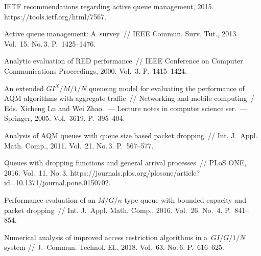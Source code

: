  \begin{multicols}{2}

\renewcommand{\bibname}{\protect\rmfamily Литература}

{\small\frenchspacing
{%
\begin{thebibliography}{99}

IETF recommendations regarding active queue management, 2015.
{\sf https://tools.\linebreak ietf.org/html/7567}.



Active queue management: A~survey~// 
{IEEE Commun. Surv. Tut.}, 2013. Vol.~15. No.\,3. P.~1425--1476.

 Analytic evaluation of RED performance~//
{IEEE Conference on Computer Communications Proceedings}, 2000. 
Vol.~3. P.~1415--1424.

An extended $GI^X/M/1/N$ queueing
model for evaluating the performance of AQM algorithms
with aggregate traffic~// Networking and mobile computing~/
Eds. Xicheng Lu and Wei Zhao.~---
Lecture notes in computer science ser.~--- Springer, 2005. Vol.~3619. P.~395--404.

Analysis of AQM queues with queue size based packet
dropping~// Int. J.~Appl. Math. Comp., 2011. Vol.~21. No.\,3. P.~567--577.

 Queues with dropping functions and general arrival
processes~// PLoS ONE, 2016. Vol.~11. No.\,3. 
{\sf https://journals.plos.org/plosone/\linebreak article?id=10.1371/journal.pone.0150702}.

 Performance evaluation of an $M/G/n$-type queue
with bounded capacity and packet dropping~// {Int. J.~Appl.
Math. Comp.}, 2016. Vol.~26. No.~4. P.~841--854.



Numerical analysis of improved access restriction algorithms in a~$GI/G/1/N$
system // {J.~Commun. Technol. El.}, 2018. Vol.~63. No.\,6. P.~616--625.


\end{thebibliography}}}
\end{multicols}
